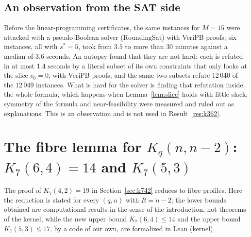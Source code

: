 \documentclass[11pt]{amsart}
\theoremstyle{definition}
\theoremstyle{remark}
\begin{document}
\subsection*{An observation from the SAT side}
Before the linear-programming certificates, the same instances for $M=15$ were attacked with a pseudo-Boolean solver (RoundingSat) with VeriPB proofs; six instances, all with $s^*=5$, took from $3.5$ to more than $30$ minutes against a median of $3.6$ seconds.
An autopsy found that they are not hard: each is refuted in at most $1.4$ seconds by a literal subset of its own constraints that only looks at the slice $c_0=0$, with VeriPB proofs, and the same two subsets refute $12\,040$ of the $12\,049$ instances.
What is hard for the solver is finding that refutation inside the whole formula, which happens when Lemma~\ref{lem:slice} holds with little slack; symmetry of the formula and near-feasibility were measured and ruled out as explanations.
This is an observation and is not used in Result~\ref{res:k362}.

\section{The fibre lemma for $K_q(n,n-2)$: $K_7(6,4)=14$ and $K_7(5,3)$}\label{sec:fibre}
The proof of $K_7(4,2)=19$ in Section~\ref{sec:k742} reduces to fibre profiles. Here the reduction is stated for every $(q,n)$ with $R=n-2$; the lower bounds obtained are computational results in the sense of the introduction, not theorems of the kernel, while the new upper bound $K_7(6,4)\le 14$ and the upper bound $K_7(5,3)\le 17$, by a code of our own, are formalized in Lean (kernel).
\end{document}
